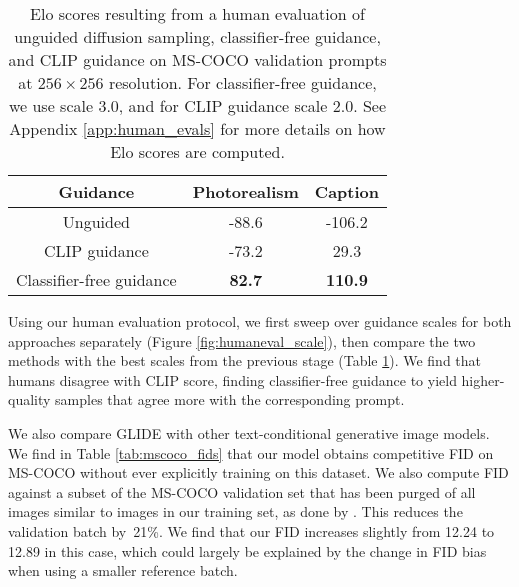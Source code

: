 \documentclass{article}
\newcommand{\modelname}{GLIDE}
\begin{document}
\begin{table}[t]
    \caption{Elo scores resulting from a human evaluation of unguided diffusion sampling, classifier-free guidance, and CLIP guidance on MS-COCO validation prompts at $256 \times 256$ resolution. For classifier-free guidance, we use scale 3.0, and for CLIP guidance scale 2.0. See Appendix \ref{app:human_evals} for more details on how Elo scores are computed.}
    \label{tab:humaneval_guidance}
    \vskip 0.15in
    \centering
    \begin{center}
    \begin{small}
    \begin{tabular}{ccc}
    \toprule
    Guidance & Photorealism & Caption \\
    \midrule
    Unguided & -88.6 & -106.2 \\
    CLIP guidance & -73.2 & 29.3 \\
    Classifier-free guidance & \bf 82.7 & \bf 110.9 \\
    \bottomrule
    \end{tabular}
    \end{small}
    \end{center}
    \vskip -0.2in
\end{table}

Using our human evaluation protocol, we first sweep over guidance scales for both approaches separately (Figure \ref{fig:humaneval_scale}), then compare the two methods with the best scales from the previous stage (Table \ref{tab:humaneval_guidance}). We find that humans disagree with CLIP score, finding classifier-free guidance to yield higher-quality samples that agree more with the corresponding prompt.

We also compare \modelname{} with other text-conditional generative image models. We find in Table \ref{tab:mscoco_fids} that our model obtains competitive FID on MS-COCO without ever explicitly training on this dataset. We also compute FID against a subset of the MS-COCO validation set that has been purged of all images similar to images in our training set, as done by \citet{dalle}. This reduces the validation batch by~21\%. We find that our FID increases slightly from 12.24 to 12.89 in this case, which could largely be explained by the change in FID bias when using a smaller reference batch.
\end{document}
